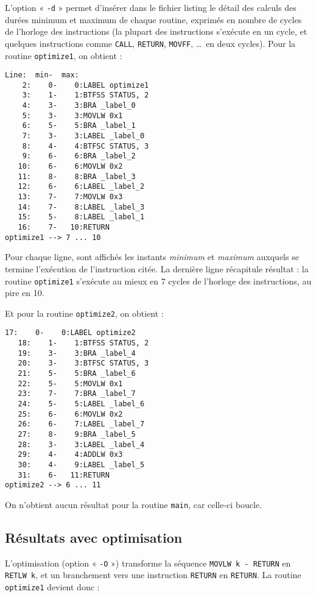 L'option « \texttt{-d} » permet d'insérer dans le fichier listing le détail des calculs des durées minimum et maximum de chaque routine, exprimés en nombre de cycles de l'horloge des instructions (la plupart des instructions s'exécute en un cycle, et quelques instructions comme \texttt{CALL}, \texttt{RETURN}, \texttt{MOVFF}, \dots\ en deux cycles). Pour la routine \texttt{optimize1}, on obtient :

\begin{lstlisting}[language=assembleur, frame=l]
 Line:  min-  max:
    2:    0-    0:LABEL optimize1
    3:    1-    1:BTFSS STATUS, 2
    4:    3-    3:BRA _label_0
    5:    3-    3:MOVLW 0x1
    6:    5-    5:BRA _label_1
    7:    3-    3:LABEL _label_0
    8:    4-    4:BTFSC STATUS, 3
    9:    6-    6:BRA _label_2
   10:    6-    6:MOVLW 0x2
   11:    8-    8:BRA _label_3
   12:    6-    6:LABEL _label_2
   13:    7-    7:MOVLW 0x3
   14:    7-    8:LABEL _label_3
   15:    5-    8:LABEL _label_1
   16:    7-   10:RETURN
optimize1 --> 7 ... 10
\end{lstlisting}

Pour chaque ligne, sont affichés les instants \emph{minimum} et \emph{maximum} auxquels se termine l'exécution de l'instruction citée. La dernière ligne récapitule résultat : la routine \texttt{optimize1} s'exécute au mieux en 7 cycles de l'horloge des instructions, au pire en 10.

Et pour la routine \texttt{optimize2}, on obtient :

\begin{lstlisting}[language=assembleur, frame=l]
   17:    0-    0:LABEL optimize2
   18:    1-    1:BTFSS STATUS, 2
   19:    3-    3:BRA _label_4
   20:    3-    3:BTFSC STATUS, 3
   21:    5-    5:BRA _label_6
   22:    5-    5:MOVLW 0x1
   23:    7-    7:BRA _label_7
   24:    5-    5:LABEL _label_6
   25:    6-    6:MOVLW 0x2
   26:    6-    7:LABEL _label_7
   27:    8-    9:BRA _label_5
   28:    3-    3:LABEL _label_4
   29:    4-    4:ADDLW 0x3
   30:    4-    9:LABEL _label_5
   31:    6-   11:RETURN
optimize2 --> 6 ... 11
\end{lstlisting}

On n'obtient aucun résultat pour la routine \texttt{main}, car celle-ci boucle.

\subsection{Résultats avec optimisation}

L'optimisation (option « \texttt{-O} ») transforme la séquence \texttt{MOVLW k - RETURN} en \texttt{RETLW k}, et un branchement vers une instruction \texttt{RETURN} en \texttt{RETURN}. La routine \texttt{optimize1} devient donc :

